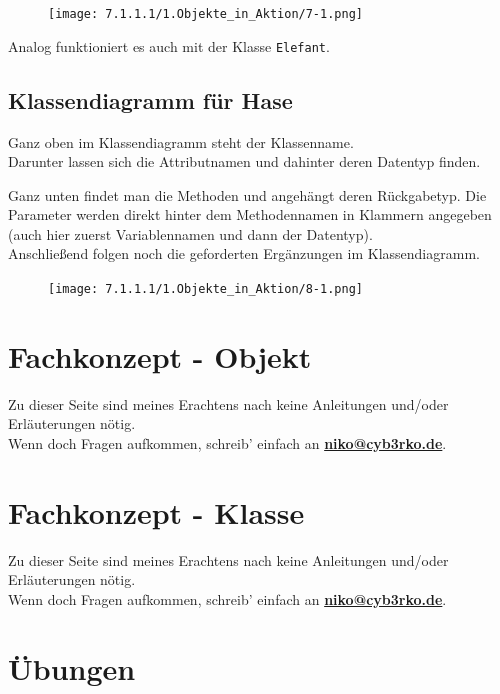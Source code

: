 \documentclass{scrartcl}   %
\begin{document}
\begin{figure}[ht]
	\centering
	\texttt{[image: 7.1.1.1/1.Objekte\_in\_Aktion/7-1.png]}
\end{figure}

Analog funktioniert es auch mit der Klasse \texttt{Elefant}.

\newpage
\subsection{Klassendiagramm für Hase}

Ganz oben im Klassendiagramm steht der Klassenname.\\
Darunter lassen sich die Attributnamen und dahinter deren Datentyp finden.

Ganz unten findet man die Methoden und angehängt deren Rückgabetyp. Die Parameter werden direkt hinter dem Methodennamen in Klammern angegeben (auch hier zuerst Variablennamen und dann der Datentyp).\\

Anschließend folgen noch die geforderten Ergänzungen im Klassendiagramm.\\

\begin{figure}[ht]
	\centering
	\texttt{[image: 7.1.1.1/1.Objekte\_in\_Aktion/8-1.png]}
\end{figure}

\newpage

\section{Fachkonzept - Objekt}
Zu dieser Seite sind meines Erachtens nach keine Anleitungen und/oder Erläuterungen nötig.\\
Wenn doch Fragen aufkommen, schreib' einfach an \textbf{\href{mailto:niko@cyb3rko.de}{niko@cyb3rko.de}}.

\newpage

\section{Fachkonzept - Klasse}
Zu dieser Seite sind meines Erachtens nach keine Anleitungen und/oder Erläuterungen nötig.\\
Wenn doch Fragen aufkommen, schreib' einfach an \textbf{\href{mailto:niko@cyb3rko.de}{niko@cyb3rko.de}}.

\newpage

\section{Übungen}
\end{document}
